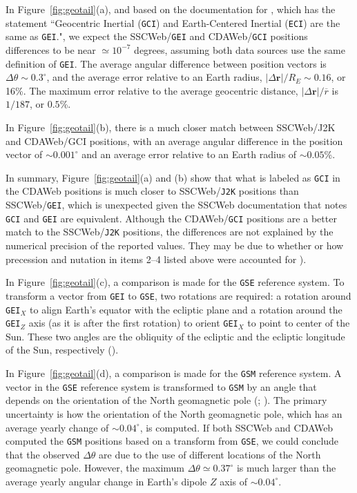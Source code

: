 \documentclass[draft]{agujournal2019}
\begin{document}
In Figure~\ref{fig:geotail}(a), and based on the documentation for , which has the statement ``Geocentric Inertial (\texttt{GCI}) and Earth-Centered Inertial (\texttt{ECI}) are the same as \texttt{GEI}.", we expect the SSCWeb/\texttt{GEI} and CDAWeb/\texttt{GCI} positions differences to be near $\simeq 10^{-7}$ degrees, assuming both data sources use the same definition of \texttt{GEI}. The average angular difference between position vectors is $\Delta \theta \sim 0.3^\circ$, and the average error relative to an Earth radius, $|\Delta\mathbf{r}|/R_E\sim 0.16$, or 16\%. The maximum error relative to the average geocentric distance, $|\Delta \mathbf{r}|/\overline{r}$ is $1/187$, or $0.5$\%.

In Figure~\ref{fig:geotail}(b), there is a much closer match between SSCWeb/J2K and CDAWeb/GCI positions, with an average angular difference in the position vector of ${\sim}0.001^\circ$ and an average error relative to an Earth radius of ${\sim}0.05$\%. 

In summary, Figure~\ref{fig:geotail}(a) and (b) show that what is labeled as \texttt{GCI} in the CDAWeb positions is much closer to SSCWeb/\texttt{J2K} positions than SSCWeb/\texttt{GEI}, which is unexpected given the SSCWeb documentation that notes \texttt{GCI} and \texttt{GEI} are equivalent. Although the CDAWeb/\texttt{GCI} positions are a better match to the SSCWeb/\texttt{J2K} positions, the differences are not explained by the numerical precision of the reported values. They may be due to whether or how precession and nutation in items 2--4 listed above were accounted for ).

In Figure~\ref{fig:geotail}(c), a comparison is made for the \texttt{GSE} reference system. To transform a vector from \texttt{GEI} to \texttt{GSE}, two rotations are required: a rotation around \texttt{GEI}$_X$ to align Earth's equator with the ecliptic plane and a rotation around the \texttt{GEI}$_Z$ axis (as it is after the first rotation) to orient \texttt{GEI}$_X$ to point to center of the Sun. These two angles are the obliquity of the ecliptic and the ecliptic longitude of the Sun, respectively ().

In Figure~\ref{fig:geotail}(d), a comparison is made for the \texttt{GSM} reference system. A vector in the \texttt{GSE} reference system is transformed to \texttt{GSM} by an angle that depends on the orientation of the North geomagnetic pole (; ). The primary uncertainty is how the orientation of the North geomagnetic pole, which has an average yearly change of ${\sim}0.04^\circ$, is computed. If both SSCWeb and CDAWeb computed the \texttt{GSM} positions based on a transform from \texttt{GSE}, we could conclude that the observed $\Delta \theta$ are due to the use of different locations of the North geomagnetic pole. However, the maximum $\Delta \theta \simeq 0.37^\circ$ is much larger than the average yearly angular change in Earth's dipole $Z$ axis of ${\sim}0.04^\circ$.
\end{document}
